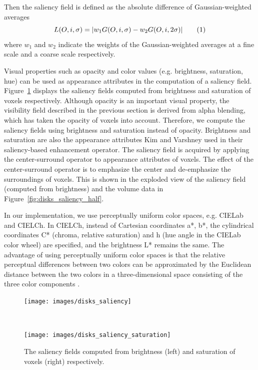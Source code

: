 Then the saliency field is defined as the absolute difference of Gaussian-weighted averages
\[ L(O,i,\sigma)=|w_{1}G(O,i,\sigma)-w_{2}G(O,i,2\sigma)|
\addtag \]
where $ w_{1} $ and $ w_{2} $ indicate the weights of the Gaussian-weighted averages at a fine scale and a coarse scale respectively.

Visual properties such as opacity and color values (e.g. brightness, saturation, hue) can be used as appearance attributes in the computation of a saliency field.
Figure~\ref{fig:disks_saliency} displays the saliency fields computed from brightness and saturation of voxels respectively.
Although opacity is an important visual property, the visibility field described in the previous section is derived from alpha blending, which has taken the opacity of voxels into account. Therefore, we compute the saliency fields using brightness and saturation instead of opacity. Brightness and saturation are also the appearance attributes Kim and Varshney \cite{kim_saliency-guided_2006} used in their saliency-based enhancement operator.
The saliency field is acquired by applying the center-surround operator to appearance attributes of voxels.
The effect of the center-surround operator is to emphasize the center and de-emphasize the surroundings of voxels. This is shown in the exploded view of the saliency field (computed from brightness) and the volume data in Figure~\ref{fig:disks_saliency_half}.

In our implementation, we use perceptually uniform color spaces, e.g. CIELab and CIELCh.
In CIELCh, instead of Cartesian coordinates a*, b*, the cylindrical coordinates C* (chroma, relative saturation) and h (hue angle in the CIELab color wheel) are specified, and the brightness L* remains the same.
The advantage of using perceptually uniform color spaces is that the relative perceptual differences between two colors can be approximated by the Euclidean distance between the two colors in a three-dimensional space consisting of the three color components \cite{fairchild_color_2013}.

\begin{figure}
	\centering
	\begin{minipage}{.15\textwidth}
		\texttt{[image: images/disks\_saliency]}
	\end{minipage}~
	\begin{minipage}{.15\textwidth}
		\texttt{[image: images/disks\_saliency\_saturation]}
	\end{minipage}
	\caption{The saliency fields computed from brightness (left) and saturation of voxels (right) respectively.}
	\label{fig:disks_saliency}
\end{figure}

